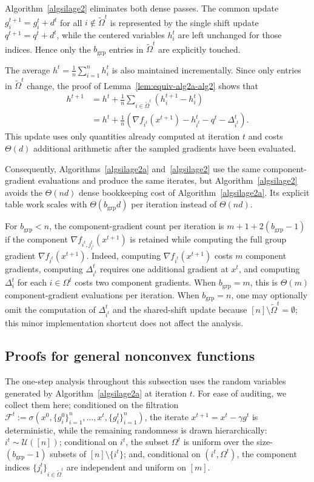 \documentclass{article}
\newcommand{\eqdef}{:=}
\newcommand{\rb}[1]{\left(#1\right)}
\theoremstyle{plain}
\begin{document}
Algorithm~\ref{algsilage2} eliminates both dense passes.
The common update $g_i^{t+1}=g_i^t+d^t$ for all $i\notin\tilde{\Omega}^t$ is represented by the single shift update $q^{t+1}=q^t+d^t$, while the centered variables $h_i^t$ are left unchanged for those indices.
Hence only the $b_{\mathrm{grp}}$ entries in $\tilde{\Omega}^t$ are explicitly touched.

The average $h^t=\frac1n\sum_{i=1}^n h_i^t$ is also maintained incrementally.
Since only entries in $\tilde{\Omega}^t$ change, the proof of Lemma~\ref{lem:equiv-alg2a-alg2} shows that
\begin{align*}
h^{t+1}
&=
h^t+\frac1n\sum_{i\in\tilde{\Omega}^t}\rb{h_i^{t+1}-h_i^t}
\\
&=
h^t+\frac1n\rb{
\nabla f_{i^t}(x^{t+1})-h_{i^t}^t-q^t-\Delta_{i^t}^t
}.
\end{align*}
This update uses only quantities already computed at iteration $t$ and costs $\Theta(d)$ additional arithmetic after the sampled gradients have been evaluated.

Consequently, Algorithms~\ref{algsilage2a} and~\ref{algsilage2} use the same component-gradient evaluations and produce the same iterates, but Algorithm~\ref{algsilage2} avoids the $\Theta(nd)$ dense bookkeeping cost of Algorithm~\ref{algsilage2a}.
Its explicit table work scales with $\Theta(b_{\mathrm{grp}}d)$ per iteration instead of $\Theta(nd)$.

For $b_{\mathrm{grp}}<n$, the component-gradient count per iteration is $m+1+2(b_{\mathrm{grp}}-1)$ if the component $\nabla f_{i^t,j_{i^t}^t}(x^{t+1})$ is retained while computing the full group gradient $\nabla f_{i^t}(x^{t+1})$.
Indeed, computing $\nabla f_{i^t}(x^{t+1})$ costs $m$ component gradients, computing $\Delta_{i^t}^t$ requires one additional gradient at $x^t$, and computing $\Delta_i^t$ for each $i\in\Omega^t$ costs two component gradients.
When $b_{\mathrm{grp}}=m$, this is $\Theta(m)$ component-gradient evaluations per iteration.
When $b_{\mathrm{grp}}=n$, one may optionally omit the computation of $\Delta_{i^t}^t$ and the shared-shift update because $[n]\setminus\tilde{\Omega}^t=\emptyset$; this minor implementation shortcut does not affect the analysis.

\subsection{Proofs for general nonconvex functions}

The one-step analysis throughout this subsection uses the random variables generated by Algorithm~\ref{algsilage2a} at iteration $t$. For ease of auditing, we collect them here; conditioned on the filtration $\mathcal{F}^t\eqdef\sigma\rb{x^0,\{g_i^0\}_{i=1}^n,\dots,x^t,\{g_i^t\}_{i=1}^n}$, the iterate $x^{t+1}=x^t-\gamma g^t$ is deterministic, while the remaining randomness is drawn hierarchically: $i^t\sim\mathcal{U}([n])$; conditional on $i^t$, the subset $\Omega^t$ is uniform over the size-$(b_{\mathrm{grp}}-1)$ subsets of $[n]\setminus\{i^t\}$; and, conditional on $(i^t,\Omega^t)$, the component indices $\{j_i^t\}_{i\in\tilde{\Omega}^t}$ are independent and uniform on $[m]$.
\end{document}
